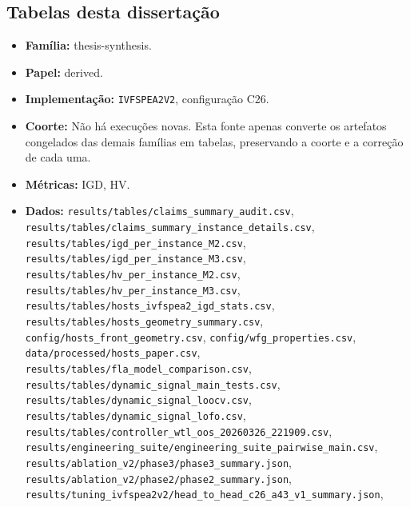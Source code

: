 \subsection*{Tabelas desta dissertação}
\begin{itemize}[nosep]\raggedright
    \item \textbf{Família:} thesis-synthesis.
    \item \textbf{Papel:} derived.
    \item \textbf{Implementação:} \texttt{IVFSPEA2V2}, configuração C26.
    \item \textbf{Coorte:} Não há execuções novas. Esta fonte apenas converte os artefatos congelados das demais famílias em tabelas, preservando a coorte e a correção de cada uma.
    \item \textbf{Métricas:} IGD, HV.
    \item \textbf{Dados:} \texttt{results/\allowbreak{}tables/\allowbreak{}claims\_\allowbreak{}summary\_\allowbreak{}audit.csv}, \texttt{results/\allowbreak{}tables/\allowbreak{}claims\_\allowbreak{}summary\_\allowbreak{}instance\_\allowbreak{}details.csv}, \texttt{results/\allowbreak{}tables/\allowbreak{}igd\_\allowbreak{}per\_\allowbreak{}instance\_\allowbreak{}M2.csv}, \texttt{results/\allowbreak{}tables/\allowbreak{}igd\_\allowbreak{}per\_\allowbreak{}instance\_\allowbreak{}M3.csv}, \texttt{results/\allowbreak{}tables/\allowbreak{}hv\_\allowbreak{}per\_\allowbreak{}instance\_\allowbreak{}M2.csv}, \texttt{results/\allowbreak{}tables/\allowbreak{}hv\_\allowbreak{}per\_\allowbreak{}instance\_\allowbreak{}M3.csv}, \texttt{results/\allowbreak{}tables/\allowbreak{}hosts\_\allowbreak{}ivfspea2\_\allowbreak{}igd\_\allowbreak{}stats.csv}, \texttt{results/\allowbreak{}tables/\allowbreak{}hosts\_\allowbreak{}geometry\_\allowbreak{}summary.csv}, \texttt{config/\allowbreak{}hosts\_\allowbreak{}front\_\allowbreak{}geometry.csv}, \texttt{config/\allowbreak{}wfg\_\allowbreak{}properties.csv}, \texttt{data/\allowbreak{}processed/\allowbreak{}hosts\_\allowbreak{}paper.csv}, \texttt{results/\allowbreak{}tables/\allowbreak{}fla\_\allowbreak{}model\_\allowbreak{}comparison.csv}, \texttt{results/\allowbreak{}tables/\allowbreak{}dynamic\_\allowbreak{}signal\_\allowbreak{}main\_\allowbreak{}tests.csv}, \texttt{results/\allowbreak{}tables/\allowbreak{}dynamic\_\allowbreak{}signal\_\allowbreak{}loocv.csv}, \texttt{results/\allowbreak{}tables/\allowbreak{}dynamic\_\allowbreak{}signal\_\allowbreak{}lofo.csv}, \texttt{results/\allowbreak{}tables/\allowbreak{}controller\_\allowbreak{}wtl\_\allowbreak{}oos\_\allowbreak{}20260326\_\allowbreak{}221909.csv}, \texttt{results/\allowbreak{}engineering\_\allowbreak{}suite/\allowbreak{}engineering\_\allowbreak{}suite\_\allowbreak{}pairwise\_\allowbreak{}main.csv}, \texttt{results/\allowbreak{}ablation\_\allowbreak{}v2/\allowbreak{}phase3/\allowbreak{}phase3\_\allowbreak{}summary.json}, \texttt{results/\allowbreak{}ablation\_\allowbreak{}v2/\allowbreak{}phase2/\allowbreak{}phase2\_\allowbreak{}summary.json}, \texttt{results/\allowbreak{}tuning\_\allowbreak{}ivfspea2v2/\allowbreak{}head\_\allowbreak{}to\_\allowbreak{}head\_\allowbreak{}c26\_\allowbreak{}a43\_\allowbreak{}v1\_\allowbreak{}summary.json}, 
\end{itemize}
